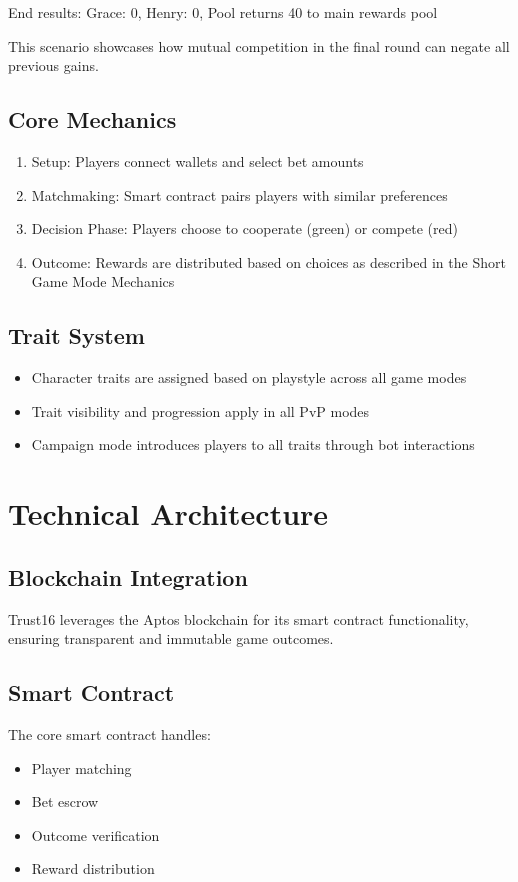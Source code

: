 \documentclass[12pt,a4paper]{article}
\begin{document}
End results: Grace: 0, Henry: 0, Pool returns 40 to main rewards pool

This scenario showcases how mutual competition in the final round can negate all previous gains.

\subsection{Core Mechanics}
\begin{enumerate}
    \item Setup: Players connect wallets and select bet amounts
    \item Matchmaking: Smart contract pairs players with similar preferences
    \item Decision Phase: Players choose to cooperate (green) or compete (red)
    \item Outcome: Rewards are distributed based on choices as described in the Short Game Mode Mechanics
\end{enumerate}

\subsection{Trait System}
\begin{itemize}
    \item Character traits are assigned based on playstyle across all game modes
    \item Trait visibility and progression apply in all PvP modes
    \item Campaign mode introduces players to all traits through bot interactions
\end{itemize}

\section{Technical Architecture}

\subsection{Blockchain Integration}
Trust16 leverages the Aptos blockchain for its smart contract functionality, ensuring transparent and immutable game outcomes.

\subsection{Smart Contract}
The core smart contract handles:
\begin{itemize}
    \item Player matching
    \item Bet escrow
    \item Outcome verification
    \item Reward distribution
\end{itemize}
\end{document}
